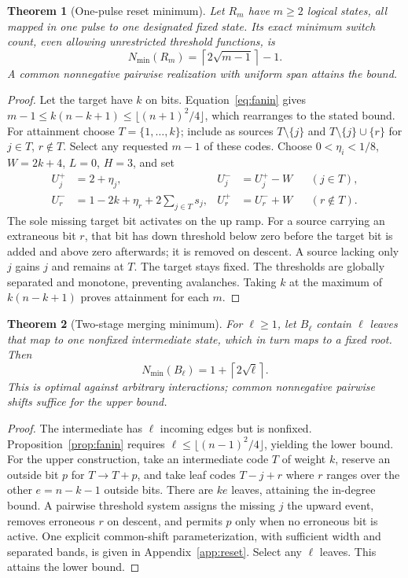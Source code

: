 \documentclass[12pt,letterpaper]{article}
\newtheorem{theorem}{Theorem}[section]
\theoremstyle{definition}\newtheorem{definition}[theorem]{Definition}
\theoremstyle{remark}\newtheorem{remark}[theorem]{Remark}
\newcommand{\Nmin}{N_{\min}}
\newcommand{\ceil}[1]{\left\lceil #1\right\rceil}
\begin{document}
\begin{theorem}[One-pulse reset minimum]\label{thm:reset}
Let $R_m$ have $m\ge2$ logical states, all mapped in one pulse to one designated fixed state. Its exact minimum switch count, even allowing unrestricted threshold functions, is
\begin{equation}\label{eq:reset}
\boxed{\Nmin(R_m)=\ceil{2\sqrt{m-1}}-1.}
\end{equation}
A common nonnegative pairwise realization with uniform span attains the bound.
\end{theorem}
\begin{proof}
Let the target have $k$ on bits. Equation~\eqref{eq:fanin} gives $m-1\le k(n-k+1)\le\lfloor(n+1)^2/4\rfloor$, which rearranges to the stated bound. For attainment choose $T=\{1,\ldots,k\}$; include as sources $T\setminus\{j\}$ and $T\setminus\{j\}\cup\{r\}$ for $j\in T$, $r\notin T$. Select any requested $m-1$ of these codes. Choose $0<\eta_i<1/8$, $W=2k+4$, $L=0$, $H=3$, and set
\begin{align}\label{eq:resetdesign}
 U_j^+&=2+\eta_j,& U_j^-&=U_j^+-W &&(j\in T),\\
 U_r^-&=1-2k+\eta_r+2\sum_{j\in T}s_j,& U_r^+&=U_r^-+W &&(r\notin T).\nonumber
\end{align}
The sole missing target bit activates on the up ramp. For a source carrying an extraneous bit $r$, that bit has down threshold below zero before the target bit is added and above zero afterwards; it is removed on descent. A source lacking only $j$ gains $j$ and remains at $T$. The target stays fixed. The thresholds are globally separated and monotone, preventing avalanches. Taking $k$ at the maximum of $k(n-k+1)$ proves attainment for each $m$.
\end{proof}

\begin{theorem}[Two-stage merging minimum]\label{thm:broom}
For $\ell\ge1$, let $B_\ell$ contain $\ell$ leaves that map to one nonfixed intermediate state, which in turn maps to a fixed root. Then
\begin{equation}\label{eq:broom}
\boxed{\Nmin(B_\ell)=1+\ceil{2\sqrt\ell}.}
\end{equation}
This is optimal against arbitrary interactions; common nonnegative pairwise shifts suffice for the upper bound.
\end{theorem}
\begin{proof}
The intermediate has $\ell$ incoming edges but is nonfixed. Proposition~\ref{prop:fanin} requires $\ell\le\lfloor(n-1)^2/4\rfloor$, yielding the lower bound. For the upper construction, take an intermediate code $T$ of weight $k$, reserve an outside bit $p$ for $T\to T+p$, and take leaf codes $T-j+r$ where $r$ ranges over the other $e=n-k-1$ outside bits. There are $ke$ leaves, attaining the in-degree bound. A pairwise threshold system assigns the missing $j$ the upward event, removes erroneous $r$ on descent, and permits $p$ only when no erroneous bit is active. One explicit common-shift parameterization, with sufficient width and separated bands, is given in Appendix~\ref{app:reset}. Select any $\ell$ leaves. This attains the lower bound.
\end{proof}
\end{document}
